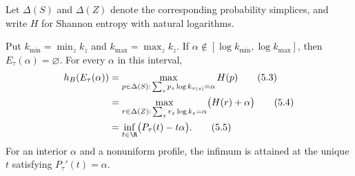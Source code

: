 Let $\Delta(S)$ and $\Delta(Z)$ denote the corresponding probability
simplices, and write $H$ for Shannon entropy with natural logarithms.

\begin{theorem}\label{thm:spectrum}
Put $k_{\min}=\min_z k_z$ and $k_{\max}=\max_z k_z$.  If
$\alpha\notin[\log k_{\min},\log k_{\max}]$, then
$E_\tau(\alpha)=\varnothing$.  For every $\alpha$ in this interval,
\begin{align}
 h_B(E_\tau(\alpha))
 &=\max_{p\in\Delta(S):\,\sum_s p_s\log k_{\tau(s)}=\alpha}H(p)
 \tag{5.3}\label{eq:spectrum-s}\\
 &=\max_{r\in\Delta(Z):\,\sum_z r_z\log k_z=\alpha}
 \bigl(H(r)+\alpha\bigr)
 \tag{5.4}\label{eq:spectrum-z}\\
 &=\inf_{t\in\R}\bigl(P_\tau(t)-t\alpha\bigr).
 \tag{5.5}\label{eq:legendre}
\end{align}
For an interior $\alpha$ and a nonuniform profile, the infimum is attained at
the unique $t$ satisfying $P_\tau'(t)=\alpha$.
\end{theorem}


